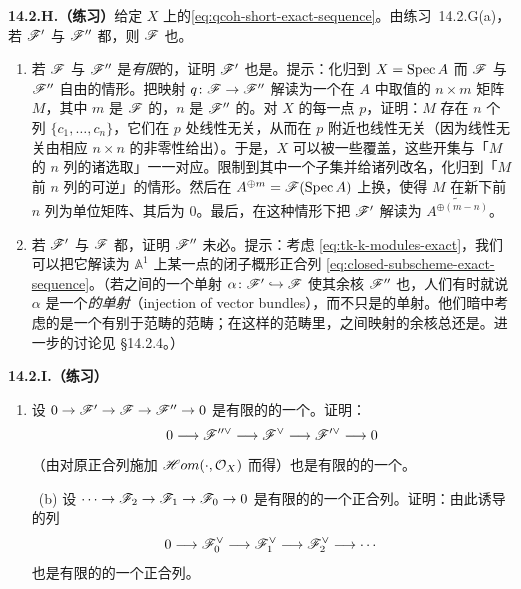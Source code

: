 \textbf{14.2.H.（练习）}\quad 给定 $X$ 上\trQCSheaf{}的\trShortExactSequence \eqref{eq:qcoh-short-exact-sequence}。由\mbox{练习~14.2.G(a)}，若 $\mathscr{F}'$ 与 $\mathscr{F}''$ 都\trLocallyFree，则 $\mathscr{F}$ 也\trLocallyFree。
\begin{enumerate}[label=(\alph*)]
\item 若 $\mathscr{F}$ 与 $\mathscr{F}''$ 是\emph{有限\trRank}的\trLocallyFreeSheaf，证明 $\mathscr{F}'$ 也是。提示：化归到 $X=\operatorname{Spec} A$ 而 $\mathscr{F}$ 与 $\mathscr{F}''$ 自由的情形。把映射 $q\colon\mathscr{F}\to\mathscr{F}''$ 解读为一个在 $A$ 中取值的 $n\times m$ 矩阵 $M$，其中 $m$ 是 $\mathscr{F}$ 的\trRank，$n$ 是 $\mathscr{F}''$ 的\trRank。对 $X$ 的每一点 $p$，证明：$M$ 存在 $n$ 个列 $\{c_1,\dots,c_n\}$，它们在 $p$ 处线性无关，从而在 $p$ 附近也线性无关（因为线性无关由相应 $n\times n$ \trDeterminant{}的非零性给出）。于是，$X$ 可以被一些\trDistinguishedOpen{}覆盖，这些开集与「$M$ 的 $n$ 列的诸选取」一一对应。限制到其中一个子集并给诸列改名，化归到「$M$ 前 $n$ 列的\trDeterminant{}可逆」的情形。然后在 $A^{\oplus m}=\mathscr{F}(\operatorname{Spec} A)$ 上换\trCoordinate，使得 $M$ 在新\trCoordinate{}下前 $n$ 列为单位矩阵、其后为 $0$。最后，在这种情形下把 $\mathscr{F}'$ 解读为 $\widetilde{A^{\oplus(m-n)}}$。
\item 若 $\mathscr{F}'$ 与 $\mathscr{F}$ 都\trLocallyFree，证明 $\mathscr{F}''$ 未必\trLocallyFree。提示：考虑 \eqref{eq:tk-k-modules-exact}，我们可以把它解读为 $\mathbb{A}^1$ 上某一点的闭子概形正合列 \eqref{eq:closed-subscheme-exact-sequence}。（若\trLocallyFreeSheaf{}之间的一个单射 $\alpha\colon\mathscr{F}'\hookrightarrow\mathscr{F}$ 使其余核 $\mathscr{F}''$ 也\trLocallyFree，人们有时就说 $\alpha$ 是一个\emph{\trVectorBundle{}的单射}（injection of vector bundles），而不只是\trLocallyFreeSheaf{}的单射。他们暗中考虑的是一个有别于\trLocallyFreeSheaf{}范畴的\trVectorBundle{}范畴；在这样的范畴里，\trVectorBundle{}之间映射的余核总还是\trVectorBundle。进一步的讨论见 \S14.2.4。）
\end{enumerate}

\textbf{14.2.I.（练习）}\quad
\begin{enumerate}[label=(\alph*)]
\item 设 $0\to\mathscr{F}'\to\mathscr{F}\to\mathscr{F}''\to 0$ 是有限\trRank{}的\trLocallyFreeSheaf{}的一个\trShortExactSequence。证明：
\[
0\longrightarrow\mathscr{F}''^{\vee}\longrightarrow\mathscr{F}^{\vee}\longrightarrow\mathscr{F}'^{\vee}\longrightarrow 0
\]
（由对原正合列施加 $\mathscr{H}om(\cdot,\mathcal{O}_X)$ 而得）也是有限\trRank{}的\trLocallyFreeSheaf{}的一个\trShortExactSequence。
\item[\hard~(b)] 设 $\cdots\to\mathscr{F}_2\to\mathscr{F}_1\to\mathscr{F}_0\to 0$ 是有限\trRank{}的\trLocallyFreeSheaf{}的一个正合列。证明：由此诱导的列
\[
0\longrightarrow\mathscr{F}_0^{\vee}\longrightarrow\mathscr{F}_1^{\vee}\longrightarrow\mathscr{F}_2^{\vee}\longrightarrow\cdots
\]
也是有限\trRank{}的\trLocallyFreeSheaf{}的一个正合列。
\end{enumerate}

